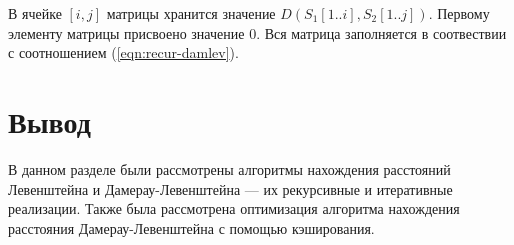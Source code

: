 В ячейке $[i, j]$ матрицы хранится значение $D(S_1[1..i], S_2[1..j])$. Пер\-вому элементу матрицы присвоено значение $0$. Вся матрица заполняется в соотвествии с соотношением (\ref{eqn:recur-damlev}).

\section*{Вывод}

В данном разделе были рассмотрены алгоритмы нахождения расстояний Левенштейна и Дамерау-Левенштейна --- их рекурсивные и итеративные реализации. Также была рассмотрена оптимизация алгоритма нахождения расстояния Дамерау-Левенштейна с помощью кэширования.